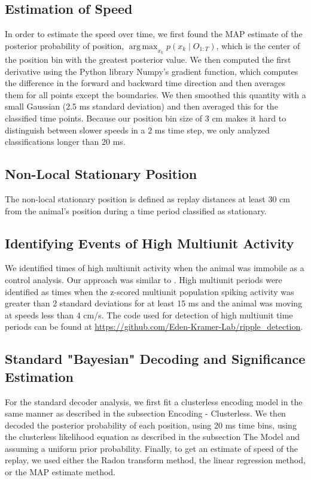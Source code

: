 \documentclass[9pt,lineno]{elife}
\DeclareMathOperator*{\argmax}{arg\,max}
\begin{document}
\subsection*{Estimation of Speed}
In order to estimate the speed over time, we first found the MAP estimate of the posterior probability of position, $\argmax_{x_k} p(x_{k} \mid O_{1:T})$, which is the center of the position bin with the greatest posterior value. We then computed the first derivative using the Python library Numpy's gradient function, which computes the difference in the forward and backward time direction and then averages them for all points except the boundaries. We then smoothed this quantity with a small Gaussian (2.5 ms standard deviation) and then averaged this for the classified time points. Because our position bin size of 3 cm makes it hard to distinguish between slower speeds in a 2 ms time step, we only analyzed classifications longer than 20 ms.

\subsection*{Non-Local Stationary Position}
The non-local stationary position is defined as replay distances at least 30 cm from the animal's position during a time period classified as stationary.

\subsection*{Identifying Events of High Multiunit Activity}
We identified times of high multiunit activity when the animal was immobile as a control analysis. Our approach was similar to \cite{DavidsonHippocampalReplayExtended2009}. High multiunit periods were identified as times when the z-scored multiunit population spiking activity was greater than 2 standard deviations for at least 15 ms and the animal was moving at speeds less than 4 cm/s. The code used for detection of high multiunit time periods can be found at \url{https://github.com/Eden-Kramer-Lab/ripple_detection}.

\subsection*{Standard "Bayesian" Decoding and Significance Estimation}
For the standard decoder analysis, we first fit a clusterless encoding model in the same manner as described in the subsection Encoding - Clusterless. We then decoded the posterior probability of each position, using 20 ms time bins, using the clusterless likelihood equation as described in the subsection The Model and assuming a uniform prior probability. Finally, to get an estimate of speed of the replay, we used either the Radon transform method, the linear regression method, or the MAP estimate method.
\end{document}
